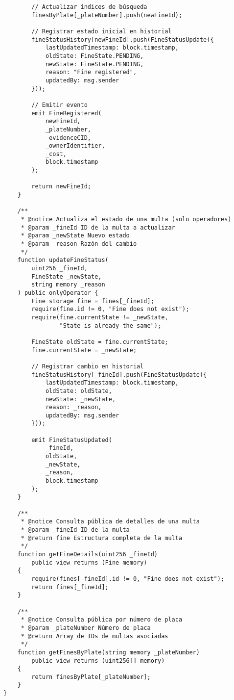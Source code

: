 \begin{verbatim}
        // Actualizar índices de búsqueda
        finesByPlate[_plateNumber].push(newFineId);

        // Registrar estado inicial en historial
        fineStatusHistory[newFineId].push(FineStatusUpdate({
            lastUpdatedTimestamp: block.timestamp,
            oldState: FineState.PENDING,
            newState: FineState.PENDING,
            reason: "Fine registered",
            updatedBy: msg.sender
        }));

        // Emitir evento
        emit FineRegistered(
            newFineId,
            _plateNumber,
            _evidenceCID,
            _ownerIdentifier,
            _cost,
            block.timestamp
        );

        return newFineId;
    }

    /**
     * @notice Actualiza el estado de una multa (solo operadores)
     * @param _fineId ID de la multa a actualizar
     * @param _newState Nuevo estado
     * @param _reason Razón del cambio
     */
    function updateFineStatus(
        uint256 _fineId,
        FineState _newState,
        string memory _reason
    ) public onlyOperator {
        Fine storage fine = fines[_fineId];
        require(fine.id != 0, "Fine does not exist");
        require(fine.currentState != _newState, 
                "State is already the same");

        FineState oldState = fine.currentState;
        fine.currentState = _newState;

        // Registrar cambio en historial
        fineStatusHistory[_fineId].push(FineStatusUpdate({
            lastUpdatedTimestamp: block.timestamp,
            oldState: oldState,
            newState: _newState,
            reason: _reason,
            updatedBy: msg.sender
        }));

        emit FineStatusUpdated(
            _fineId,
            oldState,
            _newState,
            _reason,
            block.timestamp
        );
    }

    /**
     * @notice Consulta pública de detalles de una multa
     * @param _fineId ID de la multa
     * @return fine Estructura completa de la multa
     */
    function getFineDetails(uint256 _fineId) 
        public view returns (Fine memory) 
    {
        require(fines[_fineId].id != 0, "Fine does not exist");
        return fines[_fineId];
    }

    /**
     * @notice Consulta pública por número de placa
     * @param _plateNumber Número de placa
     * @return Array de IDs de multas asociadas
     */
    function getFinesByPlate(string memory _plateNumber) 
        public view returns (uint256[] memory) 
    {
        return finesByPlate[_plateNumber];
    }
}
\end{verbatim}


